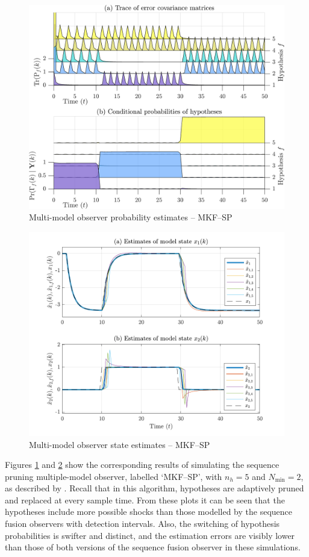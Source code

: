 \begin{figure}[htp]
	\centering
	\includegraphics[width=12cm]{images/rod_MKF_test_sim_MKF_SP_prob.png}
	\caption{Multi-model observer probability estimates – MKF--SP}
	\label{fig:rod-obs-sim-test-probs-SP}
\end{figure}
\begin{figure}[htp]
	\centering
	\includegraphics[width=13cm]{images/rod_MKF_test_sim_MKF_SP_x_est.pdf}
	\caption{Multi-model observer state estimates – MKF--SP}
	\label{fig:rod-obs-sim-test-x_est-SP}
\end{figure}
Figures \ref{fig:rod-obs-sim-test-probs-SP} and \ref{fig:rod-obs-sim-test-x_est-SP} show the corresponding results of simulating the sequence pruning multiple-model observer, labelled `MKF--SP', with $n_h=5$ and $N_{\text{min}}=2$, as described by \cite{eriksson_classification_1996}. Recall that in this algorithm, hypotheses are adaptively pruned and replaced at every sample time. From these plots it can be seen that the hypotheses include more possible shocks than those modelled by the sequence fusion observers with detection intervals. Also, the switching of hypothesis probabilities is swifter and distinct, and the estimation errors are visibly lower than those of both versions of the sequence fusion observer in these simulations.

